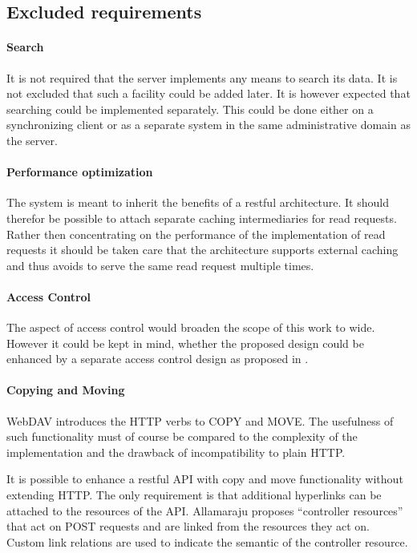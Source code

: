 \documentclass[12pt,a4paper]{scrartcl}		%
\begin{document}
\subsection{Excluded requirements}
\label{sec:excluded-requirements}
\paragraph{Search}
It is not required that the server implements any means to search its data. It
is not excluded that such a facility could be added later. It is however
expected that searching could be implemented separately. This could be done
either on a synchronizing client or as a separate system in the same
administrative domain as the server.

\paragraph{Performance optimization}
The system is meant to inherit the benefits of a restful architecture. It should
therefor be possible to attach separate caching intermediaries for read
requests. Rather then concentrating on the performance of the implementation of
read requests it should be taken care that the architecture supports external
caching and thus avoids to serve the same read request multiple times.

\paragraph{Access Control}
The aspect of access control would broaden the scope of this work to
wide. However it could be kept in mind, whether the proposed design could be
enhanced by a separate access control design as proposed in
\cite{conf/rest/GrafZLW11}.

\paragraph{Copying and Moving}
WebDAV introduces the HTTP verbs to COPY and MOVE. The usefulness of such
functionality must of course be compared to the complexity of the implementation
and the drawback of incompatibility to plain HTTP.

It is possible to enhance a restful API with copy and move functionality without
extending HTTP. The only requirement is that additional hyperlinks can be
attached to the resources of the API. Allamaraju \cite[Ch. 11]{Allamaraju_2010} proposes
``controller resources'' that act on POST requests and are linked from the
resources they act on. Custom link relations are used to indicate the semantic
of the controller resource.
\end{document}
